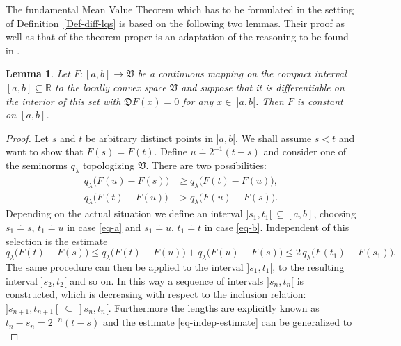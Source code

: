 \documentclass[11pt,twoside,openright]{report}
\theoremstyle{definition}
\theoremstyle{plain}
\newtheorem{Lem}[Def]{Lemma}
\theoremstyle{remark}
\theoremstyle{assumption}
\newcommand{\ql}{q_\lambda}
\newcommand{\bqlx}[1]{q_\lambda \bigl( #1 \bigr)}
\newcommand{\Rbb}{\mathbb{R}}
\newcommand{\Dfrak}{\mathfrak{D}}
\newcommand{\Vfrak}{\mathfrak{V}}
\begin{document}
The fundamental Mean Value Theorem which has to be formulated in the
setting of Definition~\ref{Def-diff-lqs} is based on the following two
lemmas. Their proof as well as that of the theorem proper is an
adaptation of the reasoning to be found in \cite[Kapitel~XX,
Abschnitt~175]{heuser:1993b}.
\begin{Lem}
  \label{Lem-lqs-diff-0-const-relation}
  Let $F : [ a , b ] \rightarrow \Vfrak$ be a continuous mapping on
  the compact interval $[ a , b ] \subseteq \Rbb$ to the locally
  convex space $\Vfrak$ and suppose that it is differentiable on the
  interior of this set with $\Dfrak F ( x ) = 0$ for any $x \in \: ] a
  , b [$. Then $F$ is constant on $[ a , b ]$.
\end{Lem}
\begin{proof}
  Let $s$ and $t$ be arbitrary distinct points in $] a , b [$. We
  shall assume $s < t$ and want to show that $F ( s ) = F ( t )$.
  Define $u \doteq 2^{-1} ( t - s )$ and consider one of the seminorms
  $\ql$ topologizing $\Vfrak$. There are two possibilities:
  \begin{subequations}
    \begin{align}
      \label{eq-a}
      \bqlx{F ( u ) - F ( s )} & \geqslant \bqlx{F ( t ) - F ( u )}
      \text{,} \\
      \label{eq-b}
      \bqlx{F ( t ) - F ( u )} & > \bqlx{F ( u ) - F ( s )} \text{.}
    \end{align}
  \end{subequations}
  Depending on the actual situation we define an interval $] s_1 , t_1
  [ \: \subseteq [ a , b ]$, choosing $s_1 \doteq s$, $t_1 \doteq u$
  in case \eqref{eq-a} and $s_1 \doteq u$, $t_1 \doteq t$ in case
  \eqref{eq-b}. Independent of this selection is the estimate
  \begin{equation}
    \label{eq-indep-estimate}
    \bqlx{F ( t ) - F ( s )} \leqslant \bqlx{F ( t ) - F ( u )} +
    \bqlx{F ( u ) - F ( s )} \leqslant 2 \, \bqlx{F ( t_1 ) - F ( s_1
    )} \text{.}
  \end{equation}
  The same procedure can then be applied to the interval $] s_1 , t_1
  [$, to the resulting interval $] s_2 , t_2 [$ and so on. In this way
  a sequence of intervals $] s_n , t_n [$ is constructed, which is
  decreasing with respect to the inclusion relation: $] s_{n+1} ,
  t_{n+1} [ \: \subseteq \: ] s_n , t_n [$. Furthermore the lengths
  are explicitly known as $t_n - s_n =  2^{-n} ( t - s )$ and the
  estimate \eqref{eq-indep-estimate} can be generalized to
  \begin{equation}

\end{equation}
\end{proof}
\end{document}
